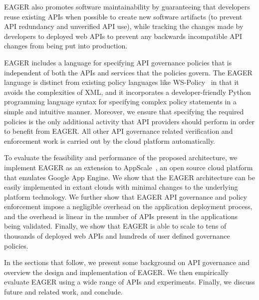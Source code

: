 EAGER also promotes software maintainability by guaranteeing that 
developers reuse existing APIs when possible to create new software artifacts
(to prevent API redundancy and unverified API use), while
tracking the changes made by developers to deployed web APIs to prevent
any backwards incompatible API changes from being put into production.

EAGER includes a language for specifying 
API governance policies that is independent of both the APIs and services that
the policies govern. 
The EAGER language is distinct from 
existing policy languages like WS-Policy~\cite{WSPolicy,soagovstandard}
in that it avoids the complexities of XML, 
and it incorporates a developer-friendly Python programming language syntax for 
specifying complex policy statements in a simple and 
intuitive manner. Moreover, we ensure that specifying the required policies 
is the only additional activity that API providers should perform in
order to benefit from EAGER. All other API governance related verification and 
enforcement work is carried out by the cloud platform automatically.

To evaluate the feasibility and performance of the proposed 
architecture, we implement EAGER as an extension to AppScale~\cite{appscale13}, 
an open source
cloud platform that emulates Google App Engine. We show that the EAGER 
architecture can be easily implemented in extant clouds with
minimal changes to the underlying platform technology. We further show that 
EAGER API governance and policy enforcement impose a negligible 
overhead on the application deployment process, and the overhead
is linear in the number of APIs present in the applications being validated.  
Finally, we show that EAGER is able to
scale to tens of thousands of deployed web APIs and hundreds of user 
defined governance policies.

In the sections that follow, we present some background on API governance
and overview the design and implementation of
EAGER. We then empirically evaluate EAGER using a wide range of APIs and
experiments.  Finally, we discuss future and related work, and conclude.
